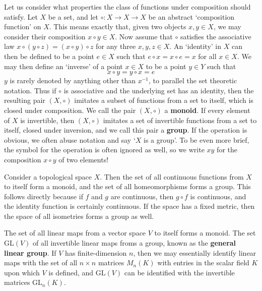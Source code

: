 Let us consider what properties the class of functions under composition should satisfy. Let $X$ be a set, and let $\circ: X \to X \to X$ be an abstract `composition function' on $X$. This means exactly that, given two objects $x,y \in X$, we may consider their composition $x \circ y \in X$. Now assume that $\circ$ satisfies the associative law $x \circ (y \circ z) = (x \circ y) \circ z$ for any three $x,y,z \in X$. An `identity' in $X$ can then be defined to be a point $e \in X$ such that $e \circ x = x \circ e = x$ for all $x \in X$. We may then define an `inverse' of a point $x \in X$ to be a point $y \in Y$ such that
%
\[ x \circ y = y \circ x = e \]
%
$y$ is rarely denoted by anything other than $x^{-1}$, to parallel the set theoretic notation. Thus if $\circ$ is associative and the underlying set has an identity, then the resulting pair $(X, \circ)$ imitates a subset of functions from a set to itself, which is closed under composition. We call the pair $(X, \circ)$ a {\bf monoid}. If every element of $X$ is invertible, then $(X, \circ)$ imitates a set of invertible functions from a set to itself, closed under inversion, and we call this pair a {\bf group}. If the operation is obvious, we often abuse notation and say `$X$ is a group'. To be even more brief, the symbol for the operation is often ignored as well, so we write $xy$ for the composition $x \circ y$ of two elements!

\begin{example}
    Consider a topological space $X$. Then the set of all continuous functions from $X$ to itself form a monoid, and the set of all homeomorphisms forms a group. This follows directly because if $f$ and $g$ are continuous, then $g \circ f$ is continuous, and the identity function is certainly continuous. If the space has a fixed metric, then the space of all isometries forms a group as well.
\end{example}

\begin{example}
    The set of all linear maps from a vector space $V$ to itself forms a monoid. The set $\mathrm{GL}(V)$ of all invertible linear maps froms a group, known as the {\bf general linear group}. If $V$ has finite-dimension $n$, then we may essentially identify linear maps with the set of all $n\times n$ matrices $M_n(K)$ with entries in the scalar field $K$ upon which $V$ is defined, and $\mathrm{GL}(V)$ can be identified with the invertible matrices $\mathrm{GL}_n(K)$.
\end{example}

